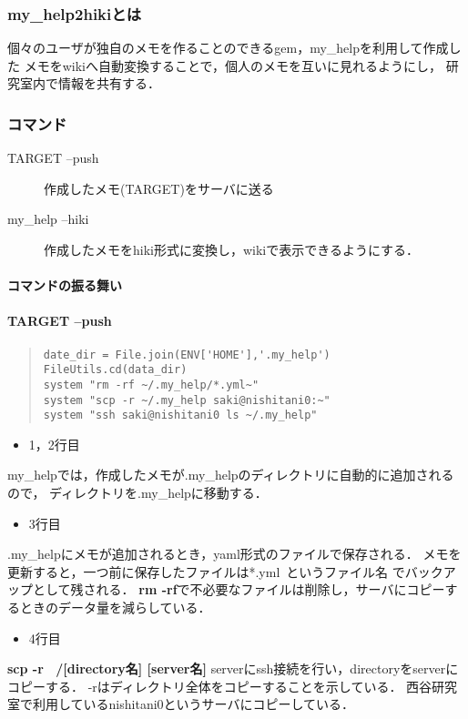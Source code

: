 \subsubsection{my\_help2hikiとは}
個々のユーザが独自のメモを作ることのできるgem，my\_helpを利用して作成した
メモをwikiへ自動変換することで，個人のメモを互いに見れるようにし，
研究室内で情報を共有する．

\subsubsection{コマンド}\begin{description}
\item[TARGET --push]  作成したメモ(TARGET)をサーバに送る

\item[my\_help --hiki]  作成したメモをhiki形式に変換し，wikiで表示できるようにする．

\end{description}
\paragraph{コマンドの振る舞い}
\paragraph{TARGET --push}\begin{quote}\begin{verbatim}
date_dir = File.join(ENV['HOME'],'.my_help')
FileUtils.cd(data_dir)
system "rm -rf ~/.my_help/*.yml~"
system "scp -r ~/.my_help saki@nishitani0:~"
system "ssh saki@nishitani0 ls ~/.my_help"
\end{verbatim}\end{quote}
\begin{itemize}
\item 1，2行目
\end{itemize}
my\_helpでは，作成したメモが.my\_helpのディレクトリに自動的に追加されるので，
ディレクトリを.my\_helpに移動する．

\begin{itemize}
\item 3行目
\end{itemize}
.my\_helpにメモが追加されるとき，yaml形式のファイルで保存される．
メモを更新すると，一つ前に保存したファイルは*.yml~というファイル名
でバックアップとして残される．
\textbf{rm -rf}で不必要なファイルは削除し，サーバにコピーするときのデータ量を減らしている．

\begin{itemize}
\item 4行目
\end{itemize}
\textbf{scp -r ~/[directory名] [server名]}
serverにssh接続を行い，directoryをserverにコピーする．
-rはディレクトリ全体をコピーすることを示している．
西谷研究室で利用しているnishitani0というサーバにコピーしている．

